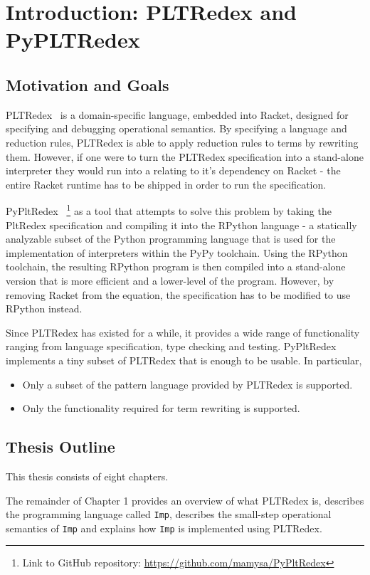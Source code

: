 \chapter{Introduction: PLTRedex and PyPLTRedex}
\section{Motivation and Goals}
PLTRedex~\cite{pltredex} is a domain-specific language, embedded into Racket, designed for specifying and debugging operational semantics. By specifying a language and reduction rules, PLTRedex is able to apply reduction rules to terms by rewriting them.
However, if one were to turn the PLTRedex specification into a stand-alone interpreter they would run into a relating to it's dependency on Racket - the entire Racket runtime has to be shipped in order to run the specification.

PyPltRedex~\cite{pypltredex-github} \footnote{Link to GitHub repository: \url{https://github.com/mamysa/PyPltRedex}} as a tool that attempts to solve this problem by taking the PltRedex specification and compiling it into the RPython language - a statically analyzable subset of the Python programming language that is used for the implementation of interpreters within the PyPy toolchain. Using the RPython toolchain, the resulting RPython program is then compiled into a stand-alone version that is more efficient and a lower-level of the program. However, by removing Racket from the equation, the specification has to be modified to use RPython instead.

Since PLTRedex has existed for a while, it provides a wide range of functionality ranging from language specification, type checking and testing. PyPltRedex implements a tiny subset of PLTRedex that is enough to be usable. In particular,

\begin{itemize}
\item Only a subset of the pattern language provided by PLTRedex is supported.
\item
Only the functionality required for term rewriting is supported.
\end{itemize}

\section{Thesis Outline}
This thesis consists of eight chapters.

The remainder of Chapter 1 provides an overview of what PLTRedex is, describes the programming language called \texttt{Imp}, describes the small-step operational semantics of \texttt{Imp} and explains how \texttt{Imp} is implemented using PLTRedex.

